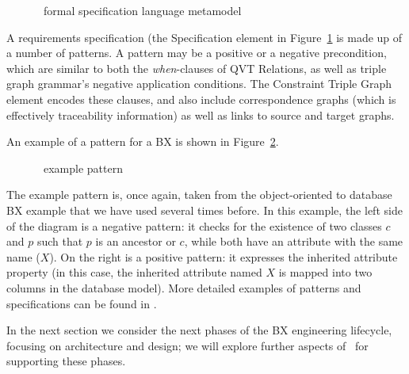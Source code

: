 \begin{figure}[htbp]
\caption{\transml\ formal specification language metamodel}
\label{fig:transml-formal-language}
\end{figure}

A requirements specification (the Specification element in Figure~\ref{fig:transml-formal-language} is made up of a number of patterns. A pattern may be a positive or a negative precondition, which are similar to both the \textit{when}-clauses of QVT Relations, as well as triple graph grammar's negative application conditions. The Constraint Triple Graph element encodes these clauses, and also include correspondence graphs (which is effectively traceability information) as well as links to source and target graphs. 

An example of a pattern for a BX is shown in Figure~\ref{fig:transml-pattern}. 

\begin{figure}[htbp]
\caption{\transml\ example pattern}
\label{fig:transml-pattern}
\end{figure}

The example pattern is, once again, taken from the object-oriented to database BX example that we have used several times before. In this example, the left side of the diagram is a negative pattern: it checks for the existence of two classes $c$ and $p$ such that $p$ is an ancestor or $c$, while both have an attribute with the same name ($X$). On the right is a positive pattern: it expresses the inherited attribute property (in this case, the inherited attribute named $X$ is mapped into two columns in the database model). More detailed examples of patterns and specifications can be found in \cite{GuerraLKPS13}.

In the next section we consider the next phases of the BX engineering lifecycle, focusing on architecture and design; we will explore further aspects of \transml\ for supporting these phases.

